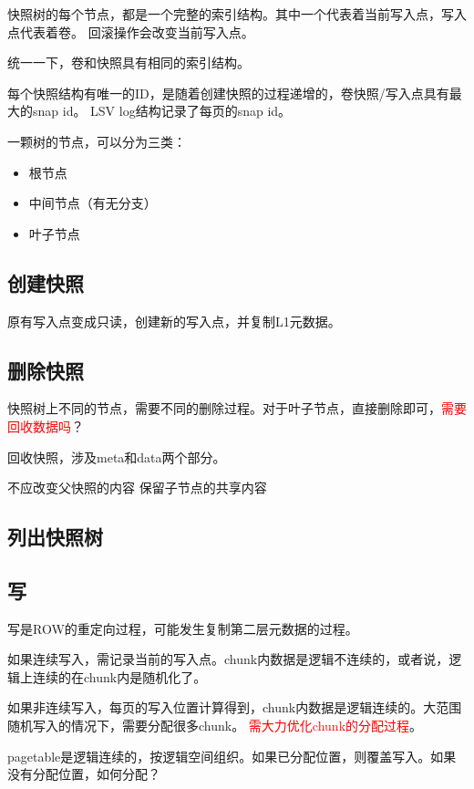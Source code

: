 快照树的每个节点，都是一个完整的索引结构。其中一个代表着当前写入点，写入点代表着卷。
回滚操作会改变当前写入点。

统一一下，卷和快照具有相同的索引结构。

每个快照结构有唯一的ID，是随着创建快照的过程递增的，卷快照/写入点具有最大的snap id。
LSV log结构记录了每页的snap id。

一颗树的节点，可以分为三类：
\begin{itemize}
    \item 根节点
    \item 中间节点（有无分支）
    \item 叶子节点
\end{itemize}

\subsection{创建快照}

原有写入点变成只读，创建新的写入点，并复制L1元数据。

\subsection{删除快照}

快照树上不同的节点，需要不同的删除过程。对于叶子节点，直接删除即可，\textcolor{red}{需要回收数据吗}？

回收快照，涉及meta和data两个部分。

不应改变父快照的内容
保留子节点的共享内容

\subsection{列出快照树}

\subsection{写}

写是ROW的重定向过程，可能发生复制第二层元数据的过程。

如果连续写入，需记录当前的写入点。chunk内数据是逻辑不连续的，或者说，逻辑上连续的在chunk内是随机化了。

如果非连续写入，每页的写入位置计算得到，chunk内数据是逻辑连续的。大范围随机写入的情况下，需要分配很多chunk。
\textcolor{red}{需大力优化chunk的分配过程}。

pagetable是逻辑连续的，按逻辑空间组织。如果已分配位置，则覆盖写入。如果没有分配位置，如何分配？

